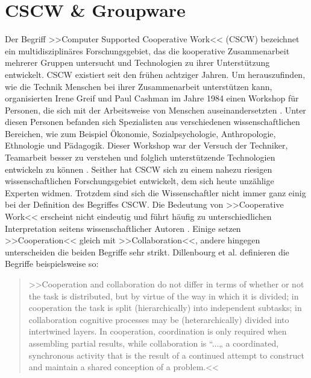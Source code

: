 \chapter{CSCW \& Groupware}\label{ch:CSCWDesign} 

	Der Begriff >>Computer Supported Cooperative Work<< (\ac{CSCW}) bezeichnet ein multidisziplinäres Forschungsgebiet, das die kooperative Zusammenarbeit mehrerer Gruppen untersucht und Technologien zu ihrer Unterstützung entwickelt. \ac{CSCW} existiert seit den frühen achtziger Jahren. Um herauszufinden, wie die Technik Menschen bei ihrer Zusammenarbeit unterstützen kann, organisierten Irene Greif und Paul Cashman im Jahre 1984 einen Workshop für Personen, die sich mit der Arbeitsweise von Menschen auseinandersetzten \citep{Grudin:1994}. Unter diesen Personen befanden sich Spezialisten aus verschiedenen wissenschaftlichen Bereichen, wie zum Beispiel Ökonomie, Sozialpsychologie, Anthropologie, Ethnologie und Pädagogik. Dieser Workshop war der Versuch der Techniker, Teamarbeit besser zu verstehen und folglich unterstützende Technologien entwickeln zu können \citep{Grudin:1994, Rama:2006p245}. Seither hat \ac{CSCW} sich zu einem nahezu riesigen wissenschaftlichen Forschungsgebiet entwickelt, dem sich heute unzählige Experten widmen. Trotzdem sind sich die Wissenschaftler nicht immer ganz einig bei der Definition des Begriffes \ac{CSCW}. Die Bedeutung von >>Cooperative Work<< erscheint nicht eindeutig und führt häufig zu unterschiedlichen Interpretation seitens wissenschaftlicher Autoren \citep{Gerlicher:2007p241}. Einige setzen >>Cooperation<< gleich mit >>Collaboration<<, andere hingegen unterscheiden die beiden Begriffe sehr strikt. Dillenbourg et al. definieren die Begriffe beispielsweise so: 
	
	\medskip\begin{quote}{>>Cooperation and collaboration do not differ in terms of whether or not the task is distributed, but by virtue of the way in which it is divided; in cooperation the task is split (hierarchically) into independent subtasks; in collaboration cognitive processes may be (heterarchically) divided into intertwined layers. In cooperation, coordination is only required when assembling partial results, while collaboration is “...„ a coordinated, synchronous activity that is the result of a continued attempt to construct and maintain a shared conception of a problem.<<} \begin{flushright}\citep{Dillenbourg:1995} \end{flushright}\end{quote}
	
